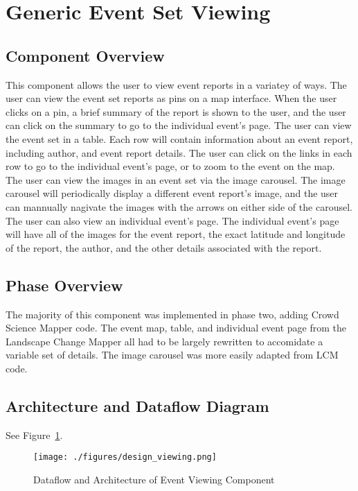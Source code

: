 \section{Generic Event Set Viewing}

\subsection{Component  Overview}
This component allows the user to view event reports in a variatey of ways. The user can view the event set reports as pins on a map interface. When the user clicks on a pin, a brief summary of the report is shown to the user, and the user can click on the summary to go to the individual event's page. The user can view the event set in a table. Each row will contain information about an event report, including author, and event report details. The user can click on the links in each row to go to the individual event's page, or to zoom to the event on the map. The user can view the images in an event set via the image carousel. The image carousel will periodically display a different event report's image, and the user can mannually nagivate the images with the arrows on either side of the carousel. The user can also view an individual event's page. The individual event's page will have all of the images for the event report, the exact latitude and longitude of the report, the author, and the other details associated with the report.

\subsection{Phase Overview}
The majority of this component was implemented in phase two, adding Crowd Science Mapper code. The event map, table, and individual event page from the Landscape Change Mapper all had to be largely rewritten to accomidate a variable set of details. The image carousel was more easily adapted from LCM code.

\subsection{ Architecture and Dataflow Diagram}
See Figure~\ref{design_viewing}.
\begin{figure}[tbh]
\begin{center}
\texttt{[image: ./figures/design\_viewing.png]}
\end{center}
\caption{Dataflow and Architecture of Event Viewing Component \label{design_viewing}}
\end{figure} 

